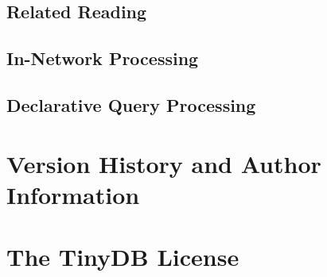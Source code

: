 \documentclass[11pt]{article}
\begin{document}
\subsection{Related Reading}
\subsection{In-Network Processing}
\subsection{Declarative Query Processing}

\section{Version History and Author Information}

\section{The TinyDB License}
\end{document}
